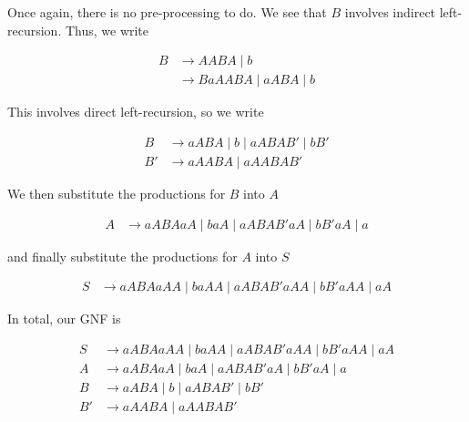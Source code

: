 Once again, there is no pre-processing to do. We see that \(B\) involves indirect left-recursion. Thus, we write 

\begin{align*}
    B &\to AABA\mid b\\
      &\to BaAABA\mid aABA\mid b
\end{align*}

This involves direct left-recursion, so we write

\begin{align*}
    B &\to aABA\mid b\mid aABAB'\mid bB'\\
    B' &\to aAABA\mid aAABAB'
\end{align*}

We then substitute the productions for \(B\) into \(A\)

\begin{align*}
    A &\to aABAaA\mid baA\mid aABAB'aA\mid bB'aA\mid a
\end{align*}

and finally substitute the productions for \(A\) into \(S\)

\begin{align*}
    S &\to aABAaAA\mid baAA\mid aABAB'aAA\mid bB'aAA\mid aA
\end{align*}

In total, our GNF is 

\begin{align*}
    S &\to aABAaAA\mid baAA\mid aABAB'aAA\mid bB'aAA\mid aA\\
    A &\to aABAaA\mid baA\mid aABAB'aA\mid bB'aA\mid a\\
    B &\to aABA\mid b\mid aABAB'\mid bB'\\
    B' &\to aAABA\mid aAABAB'
\end{align*}